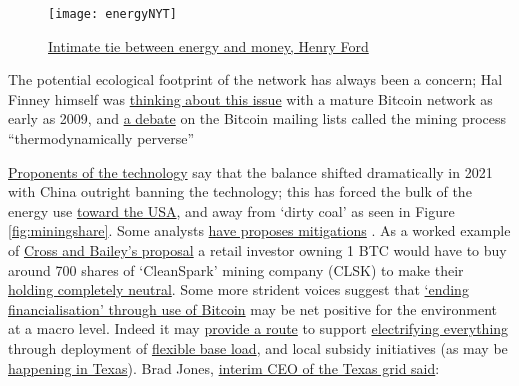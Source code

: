 \begin{figure}
  \centering
    \texttt{[image: energyNYT]}
  \caption{\href{https://www.nytimes.com/1921/12/06/archives/mr-fords-energy-dollar.html}{Intimate tie between energy and money, Henry Ford}}
  \label{fig:energyNYT}
\end{figure}
The potential ecological footprint of the network has always been a concern; Hal Finney himself was \href{https://twitter.com/halfin/status/1153096538}{thinking about this issue} with a mature Bitcoin network as early as 2009, and \href{https://satoshi.nakamotoinstitute.org/posts/bitcointalk/threads/167/#35}{a debate} on the Bitcoin mailing lists called the mining process ``thermodynamically perverse'' \par
\href{https://electricmoney.org/}{Proponents of the technology} say that the balance shifted dramatically in 2021 with China outright banning the technology; this has forced the bulk of the energy use \href{https://docs.google.com/spreadsheets/d/1E7489rM7Q62oXwk1f4NUlMvok9noAbpYfTynY2VTyww/edit#gid=0}{toward the USA}, and away from `dirty coal' as seen in Figure \ref{fig:miningshare}. Some analysts \href{https://docs.google.com/document/d/1N2N-5jY00cmteoY_puWI9oosM1foa4EQqsO1FFfIFR4/edit}{have proposes mitigations} \cite{cross2021greening}. As a worked example of \href{https://docs.google.com/spreadsheets/d/15e_a-D3x4fv3tglEzFmQ6TLQx0fZe6-iKO9Fc9SyISQ/edit#gid=0}{Cross and Bailey's proposal} a retail investor owning 1 BTC would have to buy around 700 shares of `CleanSpark' mining company (CLSK) to make their \href{https://docs.google.com/spreadsheets/d/1r32T8p_PHTP8S781u7PhPSwehLx2VcJTaJJKesMswD0/edit#gid=0}{holding completely neutral}.  Some more strident voices suggest that \href{https://medium.com/@magusperivallon/a-financial-hail-mary-for-the-climate-an-argument-for-bitcoin-adoption-9c58e707d0}{`ending financialisation' through use of Bitcoin} may be net positive for the environment at a macro level. Indeed it may \href{https://www.newsweek.com/bitcoin-mining-americas-most-misunderstood-industry-opinion-1669892}{provide a route} to support \href{https://mobile.twitter.com/DSBatten/status/1514072998881665027}{electrifying everything} through deployment of \href{https://lancium.com/solutions/}{flexible base load}, and local subsidy initiatives (as may be \href{https://braiins.com/blog/bitcoin-mining-the-grid-generators}{happening in Texas})\cite{griffith2021electrify, ercotimpact2021}. Brad Jones, \href{https://www.youtube.com/watch?v=gKnRfDeFgr0}{interim CEO of the Texas grid said}:\par
